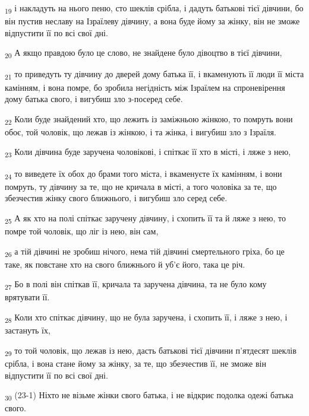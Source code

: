 \begin{tcolorbox}
\textsubscript{19} і накладуть на нього пеню, сто шеклів срібла, і дадуть батькові тієї дівчини, бо він пустив неславу на Ізраїлеву дівчину, а вона буде йому за жінку, він не зможе відпустити її по всі свої дні.
\end{tcolorbox}
\begin{tcolorbox}
\textsubscript{20} А якщо правдою було це слово, не знайдене було дівоцтво в тієї дівчини,
\end{tcolorbox}
\begin{tcolorbox}
\textsubscript{21} то приведуть ту дівчину до дверей дому батька її, і вкаменують її люди її міста камінням, і вона помре, бо зробила негідність між Ізраїлем на спроневірення дому батька свого, і вигубиш зло з-посеред себе.
\end{tcolorbox}
\begin{tcolorbox}
\textsubscript{22} Коли буде знайдений хто, що лежить із заміжньою жінкою, то помруть вони обоє, той чоловік, що лежав із жінкою, і та жінка, і вигубиш зло з Ізраїля.
\end{tcolorbox}
\begin{tcolorbox}
\textsubscript{23} Коли дівчина буде заручена чоловікові, і спіткає її хто в місті, і ляже з нею,
\end{tcolorbox}
\begin{tcolorbox}
\textsubscript{24} то виведете їх обох до брами того міста, і вкаменуєте їх камінням, і вони помруть, ту дівчину за те, що не кричала в місті, а того чоловіка за те, що збезчестив жінку свого ближнього, і вигубиш зло серед себе.
\end{tcolorbox}
\begin{tcolorbox}
\textsubscript{25} А як хто на полі спіткає заручену дівчину, і схопить її та й ляже з нею, то помре той чоловік, що ліг із нею, він сам,
\end{tcolorbox}
\begin{tcolorbox}
\textsubscript{26} а тій дівчині не зробиш нічого, нема тій дівчині смертельного гріха, бо це таке, як повстане хто на свого ближнього й уб'є його, така це річ.
\end{tcolorbox}
\begin{tcolorbox}
\textsubscript{27} Бо в полі він спіткав її, кричала та заручена дівчина, та не було кому врятувати її.
\end{tcolorbox}
\begin{tcolorbox}
\textsubscript{28} Коли хто спіткає дівчину, що не була заручена, і схопить її, і ляже з нею, і застануть їх,
\end{tcolorbox}
\begin{tcolorbox}
\textsubscript{29} то той чоловік, що лежав із нею, дасть батькові тієї дівчини п'ятдесят шеклів срібла, і вона стане йому за жінку, за те, що збезчестив її, не зможе він відпустити її по всі свої дні.
\end{tcolorbox}
\begin{tcolorbox}
\textsubscript{30} (23-1) Ніхто не візьме жінки свого батька, і не відкриє подолка одежі батька свого.
\end{tcolorbox}
